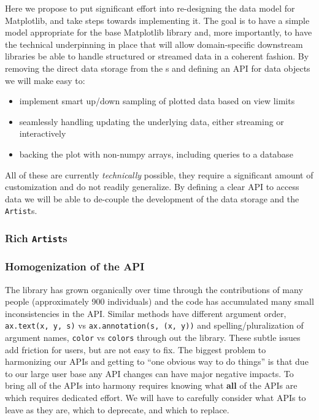 \documentclass[11pt]{article}  %
\begin{document}
Here we propose to put significant effort into re-designing the data
model for Matplotlib, and take steps towards implementing it.  The
goal is to have a simple model appropriate for the base Matplotlib
library and, more importantly, to have the technical underpinning in
place that will allow domain-specific downstream libraries be able to
handle structured or streamed data in a coherent fashion.  By removing
the direct data storage from the s and defining an API
for data objects we will make easy to:
\begin{itemize}
  \item implement smart up/down sampling of plotted data based on view
    limits
  \item seamlessly handling updating the underlying data, either
    streaming or interactively
  \item backing the plot with non-numpy arrays, including queries to a
    database
\end{itemize}
All of these are currently \textit{technically} possible, they require
a significant amount of customization and do not readily generalize.
By defining a clear API to access data we will be able to de-couple the
development of the data storage and the \texttt{Artist}s.


\subsubsection{Rich \texttt{Artist}s}


\subsubsection{Homogenization of the API}

The library has grown organically over time through the contributions
of many people (approximately 900 individuals) and the code has
accumulated many small inconsistencies in the API.  Similar methods
have different argument order, \texttt{ax.text(x, y, s)} vs
\texttt{ax.annotation(s, (x, y))} and spelling/pluralization of
argument names, \texttt{color} vs \texttt{colors} through out the
library.  These subtle issues add friction for users, but are not easy
to fix.  The biggest problem to harmonizing our APIs and getting to
``one obvious way to do things'' is that due to our large user base
any API changes can have major negative impacts.  To bring all of the
APIs into harmony requires knowing what \textbf{all} of the APIs are
which requires dedicated effort.  We will have to carefully consider
what APIs to leave as they are, which to deprecate, and which to
replace.
\end{document}
